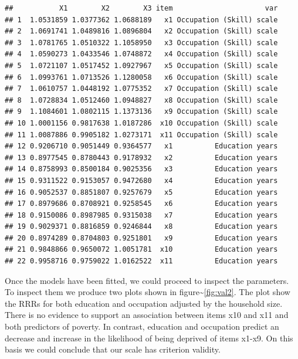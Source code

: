 \documentclass[]{book}
\begin{document}
\begin{verbatim}
##           X1        X2        X3 item                      var
## 1  1.0531859 1.0377362 1.0688189   x1 Occupation (Skill) scale
## 2  1.0691741 1.0489816 1.0896804   x2 Occupation (Skill) scale
## 3  1.0781765 1.0510322 1.1058950   x3 Occupation (Skill) scale
## 4  1.0590273 1.0433546 1.0748872   x4 Occupation (Skill) scale
## 5  1.0721107 1.0517452 1.0927967   x5 Occupation (Skill) scale
## 6  1.0993761 1.0713526 1.1280058   x6 Occupation (Skill) scale
## 7  1.0610757 1.0448192 1.0775352   x7 Occupation (Skill) scale
## 8  1.0728834 1.0512460 1.0948827   x8 Occupation (Skill) scale
## 9  1.1084601 1.0802115 1.1373136   x9 Occupation (Skill) scale
## 10 1.0001156 0.9817638 1.0187286  x10 Occupation (Skill) scale
## 11 1.0087886 0.9905182 1.0273171  x11 Occupation (Skill) scale
## 12 0.9206710 0.9051449 0.9364577   x1          Education years
## 13 0.8977545 0.8780443 0.9178932   x2          Education years
## 14 0.8758993 0.8500184 0.9025356   x3          Education years
## 15 0.9311522 0.9153057 0.9472680   x4          Education years
## 16 0.9052537 0.8851807 0.9257679   x5          Education years
## 17 0.8979686 0.8708921 0.9258545   x6          Education years
## 18 0.9150086 0.8987985 0.9315038   x7          Education years
## 19 0.9029371 0.8816859 0.9246844   x8          Education years
## 20 0.8974289 0.8704803 0.9251801   x9          Education years
## 21 0.9848866 0.9650072 1.0051781  x10          Education years
## 22 0.9958716 0.9759022 1.0162522  x11          Education years
\end{verbatim}

Once the models have been fitted, we could proceed to inspect the parameters. To inspect them we produce two plots shown in figure\textasciitilde\ref{fig:val2}. The plot show the RRRs for both education and occupation adjusted by the household size. There is no evidence to support an association between items x10 and x11 and both predictors of poverty. In contrast, education and occupation predict an decrease and increase in the likelihood of being deprived of items x1-x9. On this basis we could conclude that our scale has criterion validity.
\end{document}

